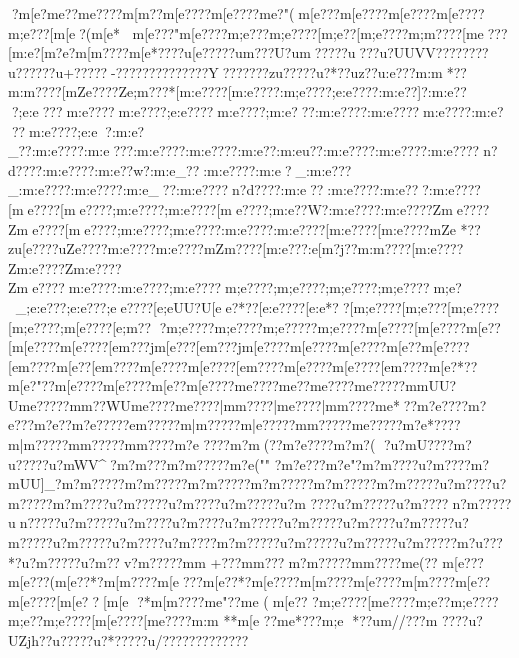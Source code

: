 {{{{{{{{{{{{{{{{{{{{{{{{{{{{{{{{{{{{{{{{{{{{{{{{{{{{{{{{{{{{{{{{{{{{{{{{{{{{{{{{{{{{{{{{{{{{{{{{{{{{{{{{{{{{{{{{{{{{{{{{{{{{{{{{{{{{{{{{{{{{{{{{{{{{{{{{{{{{{{{{{{{{{{{{{{{{{{{{{{{{{{{{{{{{{{{{{{{{{{{{{{{{{{{{{{{{{{{{{{{{{{{{{{{{{{{{{{{{{{{{{{{{{{{{{{{{{{{{{{{{{{{{{{{{{{{{{{{{{{{{{{{{{{{{{{{{{{{{{{{{{{{{{{{{{{{{{{{{{{{{{{{{{{{{{{{{{{{{{{{{{{{{{{{{{{{?{m[e   ?{m{e  ??{m{e????{m[m??{m[e????{m[e????{m{e?"({m[e???{m[e????{m[e????{m[e????{m;e?? ?[m[e ?({m[e*
{m[e???"{m[e????{m;e???{m;e????[m;e??[m;e????{m;m????[m{e???[m:e?   [m?e?   {m[m????{m[e*????u[e?????u{m???U?u{m????}?u???u?}UUVV?}?}?????}?u??????u+?????} -??????????????Y??}?????zu??? ?}?u?*? ?}{uz?  ?u:e???{m:m*??{m:m????[mZe????Ze;m???*[m:e????[m:e????:m;e????;e:e????:m:e??]?:m:e???;e:e???m:e????m:e????;e:e????m:e????;m:e???:m:e????:m:e????m:e????:m:e???m:e????;e:e}?:m:e?_??:m:e????:m:e???:m:e????:m:e????:m:e??}}:m:eu}??:m:e????:m:e????:m:e????n?d????:m:e????:m:e??w?:m:e_??:m:e????:m:e?_:m:e???_:m:e????:m:e????:m:e_??:m:e????n?d????:m:e??:m:e????:m:e???:m:e????[me????[me????;m:e????;m:e????[me????;m:e??W?:m:e????:m:e????Zme????Zme????[me????;m:e????;m:e????:m:e????:m:e????[m:e????[m:e????{mZe
*??zu[e????{uZe????{m:e????{m:e????{mZm????[m:e???:e[m?j??{m:m????[m:e????Zm:e????Zm:e????Zme????m:e????:m:e????;m:e????m;e????;m;e????;m;e????;m;e????m;e?_;e:e???;e:e???;ee????[e;eUU?U[ee?*??[e:e????[e:e*??[m;e????[m;e???[m;e????[m;e????;m[e????[e;m??
?m;e????{m;e????{m;e?????m;e????{m[e????[m[e????{m[e??[m[e????{m[e????[e{m???j{m[e???[e{m???j{m[e????{m[e????{m[e????{m[e??{m[e????[e{m????{m[e??[e{m????{m[e????{m[e????[e{m????{m[e????{m[e????[e{m????{m[e?*??{m[e?"??{m[e????{m[e????{m[e??{m[e????{m{e????{m{e??{m{e????{m{e?????m{mUU?U{m{e?????m{m??WU{m{e????{m{e????|m{m????|m{e????|m{m????{m{e*??{m?e????{m?e???{m?e??{m?e?????e{m?????m|m?????m|e?????m{m?????m{e?????m?e*????m|m?????m{m?????m{m????m?e
????m?m (??m?e??? ?m?m?(
?u?mU????m?u?????u?mWV^?m?m?}{??m?m?????m?e("" ?m?e? ? ?m?e"   ?m?m????u?m?}???m?mUU]_?m?m?????m?m?????m?m?????m?m?????m?m?????m?m?????u?m????u?m?????m?m????u?m?????u?m????u?m?????u?m
????u?m?????u?m????n?m?????un?????u?m?????u?m????u?m????u?m?????u?m?????u?m????u?m?????u?m?????u?m?????u?m????u?m????m?m?????u?m?????u?m?????u?m?????m?u???*?u?m?????u?m??v?m?????m{m +???m{m???{m?m?????m{m????{m{e(?? {m[e?? ?{m[e???({m[e??*?{m[m????{m[e???{m[e??*?{m[e????{m[m????{m[e????{m[m????{m[e??{m[e????[m[e??[m[e ?*{m[m????{m{e "??{m{e 
({m[e?? ?{m;e????[m{e????{m;e??{m;e????{m;e??{m;e????[m[e????[m{e????{m:m 
**{m[e  ??{m{e*???{m;e
*??u{m//???}{m
????u?}UZjh?}?u?????u?}*????}?u/??????}???????
}}}}}}}}}}}}}}}}}}}}}}}}}}}}}}}}}}}}}}}}}}}}}}}}}}}}}}}}}}}}}}}}}}}}}}}}}}}}}}}}}}}}}}}}}}}}}}}}}}}}}}}}}}}}}}}}}}}}}}}}}}}}}}}}}}}}}}}}}}}}}}}}}}}}}}}}}}}}}}}}}}}}}}}}}}}}}}}}}}}}}}}}}}}}}}}}}}}}}}}}}}}}}}}}}}}}}}}}}}}}}}}}}}}}}}}}}}}}}}}}}}}}}}}}}}}}}}}}}}}}}}}}}}}}}}}}}}}}}}}}}}}}}}}}}}}}}}}}}}}}}}}}}}}}}}}}}}}}}}}}}}}}}}}}}}}}}}}}}}}}}}}}}}}}}}}}}}}}}}}}}}}}}}}}}}}}}}}}}}}}}}}}}}}}}}}}}}}}}}}}}}}}}}}}}}}}}}}}}}}}}}}}}}}}}}}}}}}}}}}}}}}}}}}}}}}}}}}}}}}}}}
